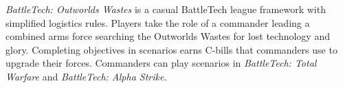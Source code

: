 \emph{BattleTech: Outworlds Wastes} is a casual BattleTech league framework with simplified logistics rules.
Players take the role of a commander leading a combined arms force searching the Outworlds Wastes for lost technology and glory.
Completing objectives in scenarios earns C-bills that commanders use to upgrade their forces.
Commanders can play scenarios in \emph{BattleTech: Total Warfare} and \emph{BattleTech: Alpha Strike}.
